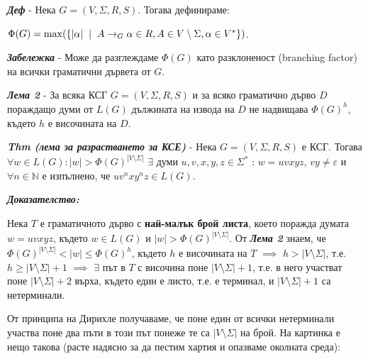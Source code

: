 \documentclass[fleqn,12pt]{article}
\DeclareMathOperator{\mmax}{max}
\begin{document}
\begin{flushleft}
\textit{\textbf{Деф}} - Нека $G = (V, \Sigma, R, S)$. Тогава дефинираме: 

$\Phi(G) = \mmax(\{|\alpha| \hspace{2mm} | \hspace{2mm} A \to_G \alpha \in R, A \in V \setminus \Sigma, \alpha \in V^*\})$.

\textit{\textbf{Забележка}} - Може да разглеждаме $\Phi(G)$ като разклоненост (branching factor) на всички граматични дървета от $G$.

\textit{\textbf{Лема 2}} - За всяка КСГ $G = (V, \Sigma, R, S)$ и за всяко граматично дърво $D$ пораждащо думи от $L(G)$ дължината на извода на $D$ не надвищава $\Phi(G)^h$, където $h$ е височината на $D$.

\textit{\textbf{Thm (лема за разрастването за КСЕ)}} - Нека $G = (V, \Sigma, R, S)$ е КСГ. 
Тогава $\forall w \in L(G): |w| > \Phi(G)^{|V \setminus \Sigma|}$  $\exists$ думи $u, v, x, y, z \in \Sigma^*$ : $w=uvxyz$, $vy \neq \varepsilon$ и $\forall n \in \mathbb{N}$ е изпълнено, че $uv^nxy^nz \in L(G)$.

\textit{\textbf{Доказателство:}}

Нека $T$ е граматичното дърво с \textbf{най-малък брой листа}, което поражда думата $w = uvxyz$, 
където $w \in L(G)$ и $|w| > \Phi(G)^{|V \setminus \Sigma|}$. 
От \textit{\textbf{Лема 2}} знаем, че $\Phi(G)^{|V \setminus \Sigma|} < |w| \leq \Phi(G)^h$, където $h$ е височината на $T$ $\implies$ $h > |V \setminus \Sigma|$, т.е. $h \geq |V \setminus \Sigma| + 1$ $\implies$ 
$\exists$ път в $T$ с височина поне $|V \setminus \Sigma| + 1$, т.е. в него участват поне $|V \setminus \Sigma| + 2$ върха, където един е листо, т.е. е терминал, и $|V \setminus \Sigma| + 1$ са нетерминали.

От принципа на Дирихле получаваме, че поне един от всички нетерминали участва поне два пъти в този път понеже те са $|V \setminus \Sigma|$ на брой. 
На картинка е нещо такова (расте надясно за да пестим хартия и опазваме околната среда):

\begin{center}
\end{center}



\end{flushleft}
\end{document}
